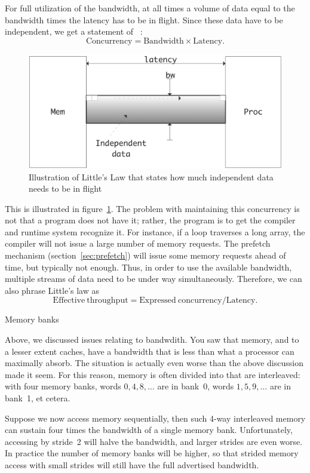 For full utilization of the bandwidth,
at all times a volume of data equal to the bandwidth times
the latency has to be in flight. Since these data have to be
independent, we get a statement of ~\cite{Little:law}:
\[ \mathrm{Concurrency}=\mathrm{Bandwidth}\times \mathrm{Latency}. \]
\begin{figure}[ht]
  \includegraphics[scale=.13]{graphics-public/little}
  \caption{Illustration of Little's Law that states how much
    independent data needs to be in flight}
  \label{fig:little}
\end{figure}
This is illustrated in figure~\ref{fig:little}. The problem with
maintaining this concurrency is not that a program does not have it;
rather, the program is to get the compiler and runtime system
recognize it. For instance, if a loop traverses a long array, the
compiler will not issue a large number of memory requests. The
prefetch mechanism (section~\ref{sec:prefetch}) will issue some memory
requests ahead of time, but typically not enough. Thus, in order to
use the available bandwidth, multiple streams of data need to be under
way simultaneously. Therefore, we can also phrase Little's law as
\[ \mathrm{Effective\ throughput}=\mathrm{Expressed\ concurrency} / \mathrm{Latency}. \]

 {Memory banks}
\label{sec:banks}

Above, we discussed issues relating to bandwdith. You saw that memory,
and to a lesser extent caches, have a bandwidth that is less than what
a processor can maximally absorb. The situation is actually even worse
than the above discussion made it seem. For this reason, memory is
often divided into  that are interleaved: with
four memory banks, words $0,4,8,\ldots$ are in bank~0, words
$1,5,9,\ldots$ are in bank~1, et cetera. 

Suppose we now access memory sequentially, then such 4-way interleaved
memory can sustain four times the bandwidth of a single memory
bank. Unfortunately,  accessing by stride~2 will halve the bandwidth,
and larger strides are even worse. In practice the number of memory
banks will be higher, so that strided memory access with small strides
will still have the full advertised bandwidth.


